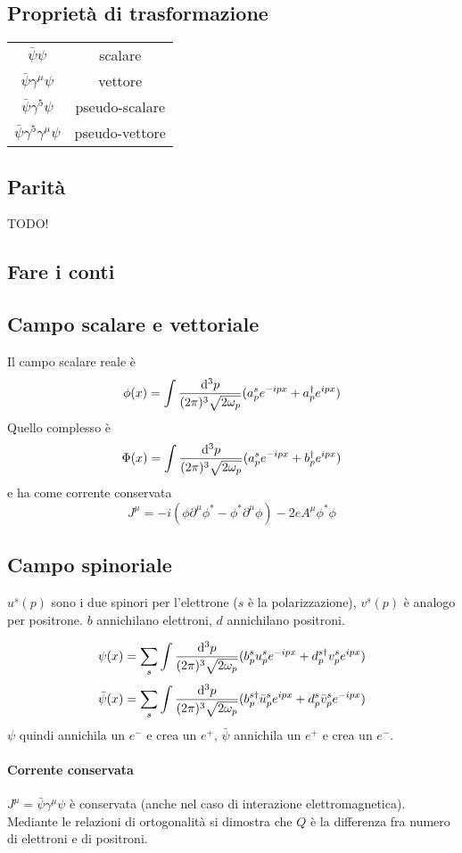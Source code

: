 \documentclass[12pt,a4paper]{article}
\begin{document}
	\subsection{Proprietà di trasformazione}
	\begin{tabular}{|c|c|}
		$\bar{\psi}\psi$&scalare  \\ 
		$\bar{\psi}\gamma^\mu\psi$&vettore  \\ 
		$\bar{\psi}\gamma^5\psi$&pseudo-scalare  \\  
		$\bar{\psi}\gamma^5\gamma^\mu\psi$&pseudo-vettore  \\  
	\end{tabular} 
	
	\subsection{Parità}
	TODO!
	
	\subsection{Fare i conti}
	\subsection{Campo scalare e vettoriale}
	Il campo scalare reale è
	\[ \phi(x) = \int \dfrac{\mathrm{d}^3 p}{(2\pi)^3\sqrt{2\omega_p}} (a_p^s e^{-ipx} + a_p^\dagger e^{ipx}) \]
	Quello complesso è
	\[ \Phi(x) = \int \dfrac{\mathrm{d}^3 p}{(2\pi)^3\sqrt{2\omega_p}} (a_p^s e^{-ipx} + b_p^\dagger e^{ipx}) \]
	e ha come corrente conservata
	\[ J^\mu = -i(\phi\partial^\mu \phi^* - \phi^*\partial^\mu \phi) -2eA^\mu \phi^*\phi \]
	\subsection{Campo spinoriale}
	$u^s(p)$ sono i due spinori per l'elettrone ($s$ è la polarizzazione), $v^s(p)$ è analogo per positrone. $b$ annichilano elettroni, $d$ annichilano positroni.
	
	\[ \psi(x) = \sum_s \int \dfrac{\mathrm{d}^3 p}{(2\pi)^3\sqrt{2\omega_p}} (b_p^s u_p^s e^{-ipx} + d_p^{s\dagger} v_p^s e^{ipx}) \]
	\[ \bar{\psi}(x) = \sum_s \int \dfrac{\mathrm{d}^3 p}{(2\pi)^3\sqrt{2\omega_p}} (b_p^{s\dagger} \bar{u}_p^s e^{ipx} + d_p^s \bar{v}_p^s e^{-ipx}) \]
	$\psi$ quindi annichila un $e^{-}$ e crea un $e^{+}$, $\bar{\psi}$ annichila un $e^{+}$ e crea un $e^{-}$.
	
	\paragraph{Corrente conservata} $J^\mu = \bar{\psi} \gamma^\mu \psi$ è conservata (anche nel caso di interazione elettromagnetica). Mediante le relazioni di ortogonalità si dimostra che $Q$ è la differenza fra numero di elettroni e di positroni.
	
\end{document}
